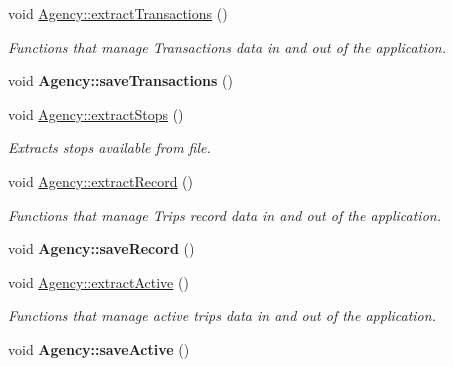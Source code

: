 \begin{DoxyCompactItemize}
\mbox{\label{group___agency_gadfda62c1a33db5f797098d0391e6ee87}} 
void \hyperlink{group___agency_gadfda62c1a33db5f797098d0391e6ee87}{Agency\+::extract\+Transactions} ()
\begin{DoxyCompactList}\small\item\em Functions that manage Transactions data in and out of the application. \end{DoxyCompactList}\item 
\mbox{\label{group___agency_gae72ab0970ba685c5a57360047f8a38e7}} 
void {\bfseries Agency\+::save\+Transactions} ()
\item 
\mbox{\label{group___agency_ga10184101969b3eeea8eea72cb058fbd4}} 
void \hyperlink{group___agency_ga10184101969b3eeea8eea72cb058fbd4}{Agency\+::extract\+Stops} ()
\begin{DoxyCompactList}\small\item\em Extracts stops available from file. \end{DoxyCompactList}\item 
\mbox{\label{group___agency_ga8cafe0f0410e881f1a0d7a1bdd502058}} 
void \hyperlink{group___agency_ga8cafe0f0410e881f1a0d7a1bdd502058}{Agency\+::extract\+Record} ()
\begin{DoxyCompactList}\small\item\em Functions that manage Trips record data in and out of the application. \end{DoxyCompactList}\item 
\mbox{\label{group___agency_gaa66b3d72d32473933366c4c4beefdb7e}} 
void {\bfseries Agency\+::save\+Record} ()
\item 
\mbox{\label{group___agency_ga82ad0980163a0e874b1ca165b7b9c91c}} 
void \hyperlink{group___agency_ga82ad0980163a0e874b1ca165b7b9c91c}{Agency\+::extract\+Active} ()
\begin{DoxyCompactList}\small\item\em Functions that manage active trips data in and out of the application. \end{DoxyCompactList}\item 
\mbox{\label{group___agency_ga4ca6cbd58c07be755c1f872e8faa8719}} 
void {\bfseries Agency\+::save\+Active} ()
\end{DoxyCompactItemize}
